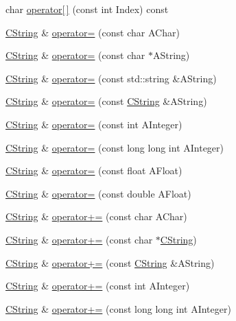\begin{DoxyCompactItemize}
char \hyperlink{classCString_a0ad5135473357c40ac255a2cbb75a937}{operator\mbox{[}$\,$\mbox{]}} (const int Index) const 
\item 
\hyperlink{classCString}{C\-String} \& \hyperlink{classCString_a03c99632be1b07a489ed677cfea2537e}{operator=} (const char A\-Char)
\item 
\hyperlink{classCString}{C\-String} \& \hyperlink{classCString_a1379ca0272b5334e40042ab48cbbb6a1}{operator=} (const char $\ast$A\-String)
\item 
\hyperlink{classCString}{C\-String} \& \hyperlink{classCString_a203840b4ed77dc743a4668312467c4aa}{operator=} (const std\-::string \&A\-String)
\item 
\hyperlink{classCString}{C\-String} \& \hyperlink{classCString_a0fa494797f6a88fe7e9ed763d14ade76}{operator=} (const \hyperlink{classCString}{C\-String} \&A\-String)
\item 
\hyperlink{classCString}{C\-String} \& \hyperlink{classCString_a5cc8d78429b184ea149062860789cedd}{operator=} (const int A\-Integer)
\item 
\hyperlink{classCString}{C\-String} \& \hyperlink{classCString_abb27f8882ce9feccd9fea0e012baaaf2}{operator=} (const long long int A\-Integer)
\item 
\hyperlink{classCString}{C\-String} \& \hyperlink{classCString_aca99b7b0ceb1e34e396182b8b0971195}{operator=} (const float A\-Float)
\item 
\hyperlink{classCString}{C\-String} \& \hyperlink{classCString_a504bfbe2fd078947cc1cd4d516159314}{operator=} (const double A\-Float)
\item 
\hyperlink{classCString}{C\-String} \& \hyperlink{classCString_aed7480ec165f8c11256a6162910809b7}{operator+=} (const char A\-Char)
\item 
\hyperlink{classCString}{C\-String} \& \hyperlink{classCString_a5c228575f753a36d3ee5e69c6d8fa3e7}{operator+=} (const char $\ast$\hyperlink{classCString}{C\-String})
\item 
\hyperlink{classCString}{C\-String} \& \hyperlink{classCString_a218cf094ec2b579f6f7c85ddb22fb633}{operator+=} (const \hyperlink{classCString}{C\-String} \&A\-String)
\item 
\hyperlink{classCString}{C\-String} \& \hyperlink{classCString_ad32f8a2e9e52a7b210ef861f1660c0f8}{operator+=} (const int A\-Integer)
\item 
\hyperlink{classCString}{C\-String} \& \hyperlink{classCString_a35fe1258ea8de7de995f5a1a6e1f6665}{operator+=} (const long long int A\-Integer)
\item 

\end{DoxyCompactItemize}
